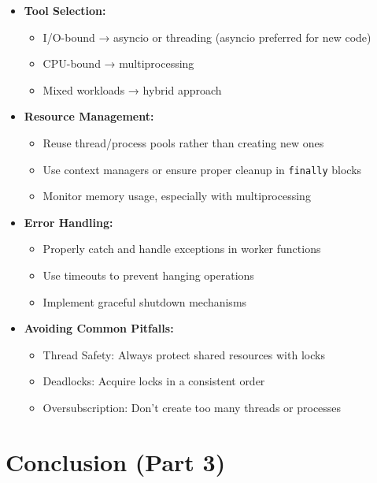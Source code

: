 \documentclass[12pt,letterpaper]{article}
\begin{document}
\begin{itemize}
    \item \textbf{\textcolor{pythonBlue}{Tool Selection:}}
    \begin{itemize}
        \item I/O-bound → asyncio or threading (asyncio preferred for new code)
        \item CPU-bound → multiprocessing
        \item Mixed workloads → hybrid approach
    \end{itemize}
    
    \item \textbf{\textcolor{pythonBlue}{Resource Management:}}
    \begin{itemize}
        \item Reuse thread/process pools rather than creating new ones
        \item Use context managers or ensure proper cleanup in \texttt{finally} blocks
        \item Monitor memory usage, especially with multiprocessing
    \end{itemize}
    
    \item \textbf{\textcolor{pythonBlue}{Error Handling:}}
    \begin{itemize}
        \item Properly catch and handle exceptions in worker functions
        \item Use timeouts to prevent hanging operations
        \item Implement graceful shutdown mechanisms
    \end{itemize}
    
    \item \textbf{\textcolor{pythonBlue}{Avoiding Common Pitfalls:}}
    \begin{itemize}
        \item Thread Safety: Always protect shared resources with locks
        \item Deadlocks: Acquire locks in a consistent order
        \item Oversubscription: Don't create too many threads or processes
    \end{itemize}
\end{itemize}

\section{Conclusion (Part 3)}
\end{document}
